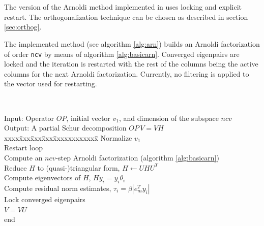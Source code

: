 \section{}

The version of the Arnoldi method implemented in \slepc uses locking and explicit restart. The orthogonalization technique can be chosen as described in section \ref{sec:orthog}.

The implemented method (see algorithm \ref{alg:arn}) builds an Arnoldi factorization of order \Verb!ncv! by means of algorithm \ref{alg:basicarn}. Converged eigenpairs are locked and the iteration is restarted with the rest of the columns being the active columns for the next Arnoldi factorization. Currently, no filtering is applied to the vector used for restarting.

\begin{algorithm}~\rm
\begin{tabbing}
Input: Operator $O\!P$, initial vector $v_1$, and dimension of the subspace $ncv$ \\
Output: A partial Schur decomposition $O\!P\,V=VH$ \\
xxxx\=xxx\=xxx\=xxx\=xxxxxxxxxxxx\=\kill
\> Normalize $v_1$\\
\> Restart loop\\
\> \> Compute an $ncv$-step Arnoldi factorization (algorithm \ref{alg:basicarn})\\
\> \> Reduce $H$ to (quasi-)triangular form, $H\leftarrow UHU^T$\\
\> \> Compute eigenvectors of $H$, $Hy_i=y_i\theta_i$ \\
\> \> Compute residual norm estimates, $\tau_i=\beta |e_m^Ty_i|$ \\
\> \> Lock converged eigenpairs\\
\> \> $V=VU$\\
\> end\\
\end{tabbing}
\end{algorithm}

